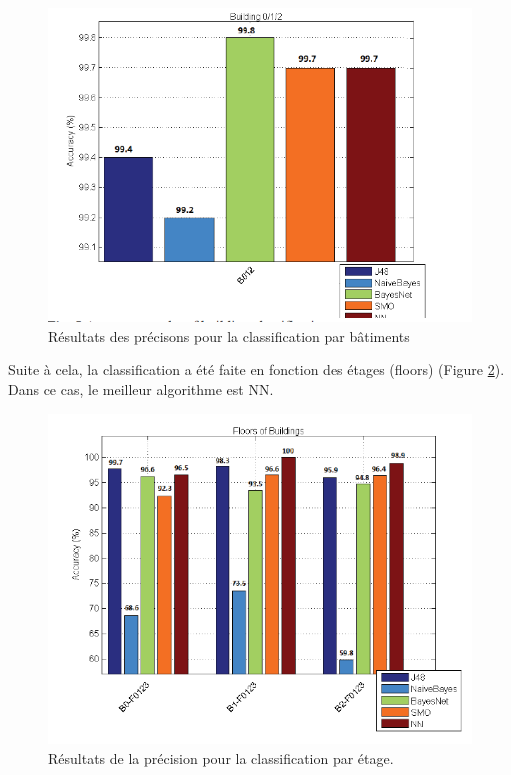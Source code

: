 \begin{figure}[htp]
 \begin{center}
  \includegraphics[scale=0.6]{figures/bluildingClassification.png}
  \caption{Résultats des précisons pour la classification par bâtiments \cite{ML_algo}}
  \label{fig:builClass} %
 \end{center}
\end{figure}

Suite à cela, la classification a été faite en fonction des étages (floors) (Figure \ref{fig:floorClass}). Dans ce cas, le meilleur algorithme est NN. 

\begin{figure}[htp]
 \begin{center}
  \includegraphics[scale=0.6]{figures/floorClassification.png}
  \caption{Résultats de la précision pour la classification par étage.\cite{ML_algo}}
  \label{fig:floorClass} %
 \end{center}
\end{figure}


